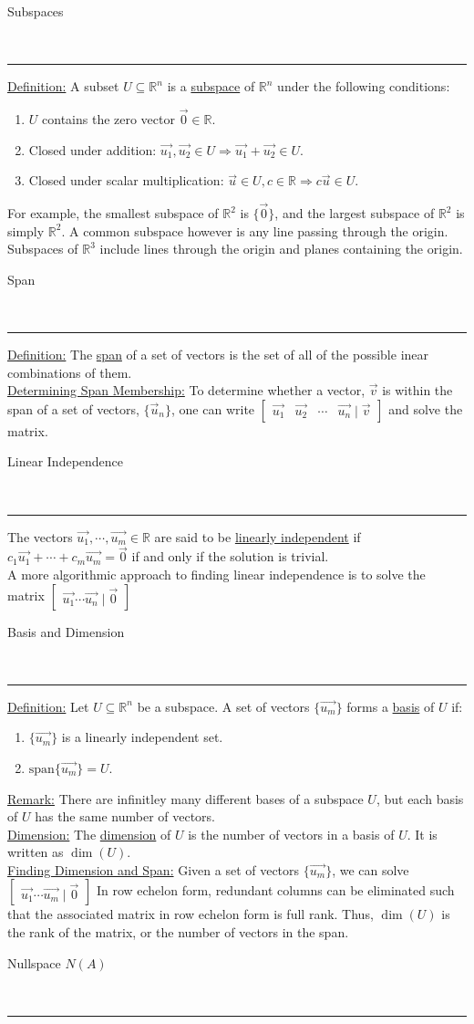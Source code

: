 \documentclass{article}
\newcommand{\header}[1]{\begin{large}\noindent #1\end{large}\\\rule{\textwidth}{0.5pt}}
\newcommand{\gap}{\medskip\\}
\begin{document}
\header{Subspaces}

\underline{Definition:} A subset $U \subseteq \mathbb{R}^n$ is a \underline{subspace} of
$\mathbb{R}^n$ under the following conditions:
\begin{enumerate}
    \item $U$ contains the zero vector $\vec{0} \in \mathbb{R}$.
    \item Closed under addition: $\vec{u_1}, \vec{u_2} \in U \Rightarrow \vec{u_1} + \vec{u_2} \in U$.
    \item Closed under scalar multiplication: $\vec{u} \in U, c \in \mathbb{R} \Rightarrow c\vec{u} \in U$.
\end{enumerate}

For example, the smallest subspace of $\mathbb{R}^2$ is $\{\vec{0}\}$, and the largest
subspace of $\mathbb{R}^2$ is simply $\mathbb{R}^2$. A common subspace however is
any line passing through the origin.
\gap
Subspaces of $\mathbb{R}^3$ include lines through the origin and planes containing
the origin.
\gap
\header{Span}
\underline{Definition:} The \underline{span} of a set of vectors is the set of all of
the possible inear combinations of them.
\gap
\underline{Determining Span Membership:} To determine whether a vector, $\vec{v}$ is within the
span of a set of vectors, $\{\vec{u}_n\}$, one can write $\begin{bmatrix}
    \vec{u_1} & \vec{u_2} & \cdots & \vec{u_n} \mid \vec{v}
\end{bmatrix}$ and solve the matrix.
\gap
\header{Linear Independence}
The vectors $\vec{u_1}, \cdots, \vec{u_m}\in \mathbb{R}$ are said to be
\underline{linearly independent} if $c_1\vec{u_1} + \cdots + c_m\vec{u_m} = \vec{0}$
if and only if the solution is trivial.
\gap
A more algorithmic approach to finding linear independence is to solve the matrix
$\begin{bmatrix}
    \vec{u_1} \cdots \vec{u_n} \mid \vec{0}
\end{bmatrix}$

\header{Basis and Dimension}

\underline{Definition:} Let $U \subseteq \mathbb{R}^n$ be a subspace. A set of vectors
$\{\vec{u_m}\}$ forms a \underline{basis} of $U$ if:
\begin{enumerate}
    \item $\{\vec{u_m}\}$ is a linearly independent set.
    \item $\textrm{span}\{\vec{u_m}\} = U$.
\end{enumerate}
\underline{Remark:} There are infinitley many different bases of a subspace $U$,
but each basis of $U$ has the same number of vectors.
\gap
\underline{Dimension:} The \underline{dimension} of $U$ is the number of vectors in a
basis of $U$. It is written as $\dim(U)$.
\gap
\underline{Finding Dimension and Span:}
Given a set of vectors $\{\vec{u_m}\}$, we can solve $\begin{bmatrix}
    \vec{u_1} \cdots \vec{u_m} \mid \vec{0}
\end{bmatrix}$
In row echelon form, redundant columns can be eliminated such that the associated
matrix in row echelon form is full rank. Thus, $\dim(U)$ is the rank of the matrix,
or the number of vectors in the span.
\gap
\header{Nullspace $N(A)$}
\end{document}
